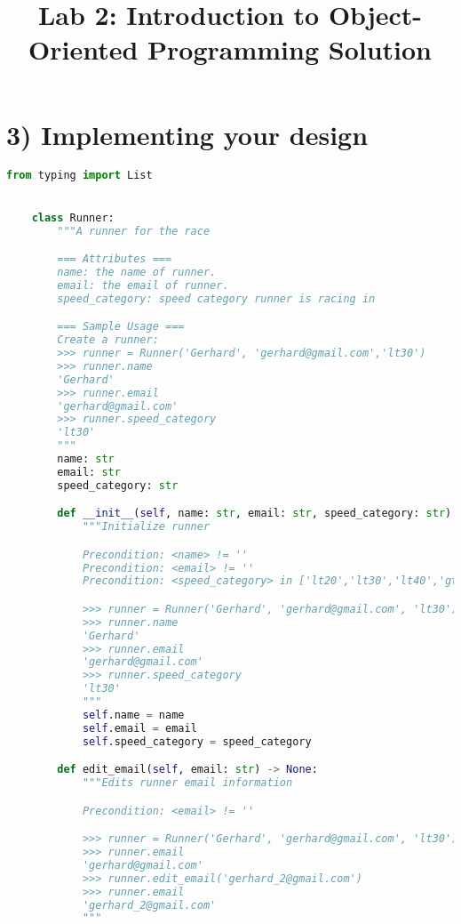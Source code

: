 \documentclass[12pt]{article}
\begin{document}
\title{Lab 2: Introduction to Object-Oriented Programming Solution}
\date{}
\maketitle

\section*{3) Implementing your design}

\begin{lstlisting}[language=Python]
    from typing import List


    class Runner:
        """A runner for the race

        === Attributes ===
        name: the name of runner.
        email: the email of runner.
        speed_category: speed category runner is racing in

        === Sample Usage ===
        Create a runner:
        >>> runner = Runner('Gerhard', 'gerhard@gmail.com','lt30')
        >>> runner.name
        'Gerhard'
        >>> runner.email
        'gerhard@gmail.com'
        >>> runner.speed_category
        'lt30'
        """
        name: str
        email: str
        speed_category: str

        def __init__(self, name: str, email: str, speed_category: str) -> None:
            """Initialize runner

            Precondition: <name> != ''
            Precondition: <email> != ''
            Precondition: <speed_category> in ['lt20','lt30','lt40','gt40','']

            >>> runner = Runner('Gerhard', 'gerhard@gmail.com', 'lt30')
            >>> runner.name
            'Gerhard'
            >>> runner.email
            'gerhard@gmail.com'
            >>> runner.speed_category
            'lt30'
            """
            self.name = name
            self.email = email
            self.speed_category = speed_category

        def edit_email(self, email: str) -> None:
            """Edits runner email information

            Precondition: <email> != ''

            >>> runner = Runner('Gerhard', 'gerhard@gmail.com', 'lt30')
            >>> runner.email
            'gerhard@gmail.com'
            >>> runner.edit_email('gerhard_2@gmail.com')
            >>> runner.email
            'gerhard_2@gmail.com'
            """


\end{lstlisting}
\end{document}
